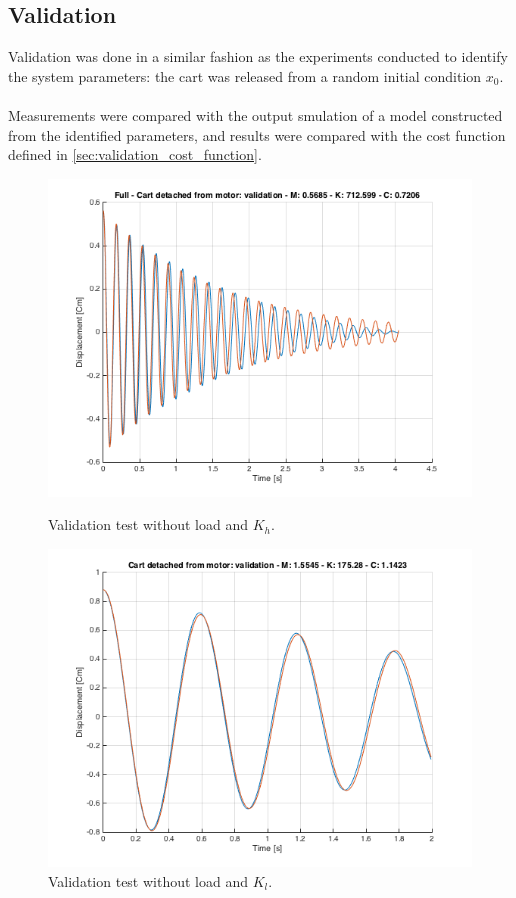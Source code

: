 \subsection{Validation}
Validation was done in a similar fashion as the experiments conducted to identify the system parameters: the cart was released from a random initial condition $x_0$. \\ \\ 
Measurements  were compared with the output smulation of a model constructed from the identified parameters, and results were compared with the cost function defined in \ref{sec:validation_cost_function}.


\begin{figure} [!h]
\begin{minipage}[t]{0.4\textwidth}
\includegraphics[width=\linewidth]{img/validation_m_kh_full.png}
\caption{Validation test without load and $K_h$.}
\label{fig:val1_1}
\end{minipage}
\hspace{\fill}
\begin{minipage}[t]{0.4\textwidth}
\includegraphics[width=\linewidth]{img/validation_ml_kl_partial.png}
\caption{Validation test without load and $K_l$.}
\label{fig:val1_2}
\end{minipage}


\end{figure}
